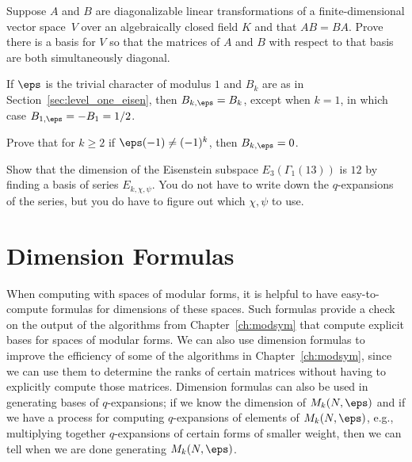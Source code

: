 \begin{exercises}


\item\label{ex:diag} Suppose $A$ and $B$ are diagonalizable linear
  transformations of a finite-dimensional vector space~$V$ over an
  algebraically closed field $K$ and that $AB=BA$.  Prove there is a
  basis for $V$ so that the matrices of $A$ and $B$ with respect to
  that basis are both simultaneously diagonal.

\item\label{ex:bern_triv} If $\eps$ is the trivial character of
  modulus $1$ and $B_k$ are as in Section~\ref{sec:level_one_eisen},
  then $B_{k,\eps} = B_k$, except when $k=1$, in which case
  $B_{1,\eps} = -B_1 = 1/2$.

\item \label{ex:gbparity} Prove that for $k\geq 2$ if $\eps(-1) \neq (-1)^k$,
then $B_{k,\eps} = 0$.

\item\label{ex:dime3} Show that the dimension of the Eisenstein subspace
  $E_3(\Gamma_1(13))$ is $12$ by finding a basis of series
  $E_{k,\chi,\psi}$.  You do not have to write down the $q$-expansions
  of the series, but you do have to figure out which $\chi, \psi$ to
  use.

\end{exercises}




















\chapter{Dimension Formulas}
\label{ch:dim}

When computing with spaces of modular forms, it is helpful to have
easy-to-compute formulas for dimensions of these spaces.  Such
formulas provide a check on the output of the algorithms from
Chapter~\ref{ch:modsym} that compute explicit bases for spaces of
modular forms.  We can also use dimension formulas to improve the
efficiency of some of the algorithms in Chapter~\ref{ch:modsym}, since
we can use them to determine the ranks of certain matrices without
having to explicitly compute those matrices.  Dimension formulas can also be
used in generating bases of $q$-expansions; if we know the dimension
of $M_k(N,\eps)$ and if we have a process for computing $q$-expansions
of elements of $M_k(N,\eps)$, e.g., multiplying together
$q$-expansions of certain forms of smaller weight, then we can tell
when we are done generating $M_k(N,\eps)$.

